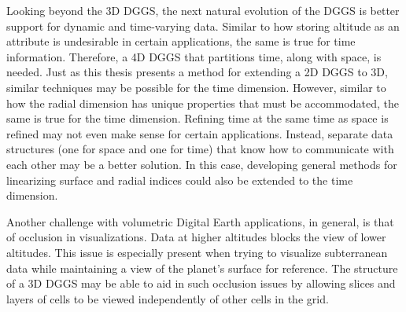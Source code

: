 Looking beyond the 3D DGGS, the next natural evolution of the DGGS is better support for dynamic and time-varying data.
Similar to how storing altitude as an attribute is undesirable in certain applications, the same is true for time information.
Therefore, a 4D DGGS that partitions time, along with space, is needed.
Just as this thesis presents a method for extending a 2D DGGS to 3D, similar techniques may be possible for the time dimension.
However, similar to how the radial dimension has unique properties that must be accommodated, the same is true for the time dimension.
Refining time at the same time as space is refined may not even make sense for certain applications.
Instead, separate data structures (one for space and one for time) that know how to communicate with each other may be a better solution.
In this case, developing general methods for linearizing surface and radial indices could also be extended to the time dimension.


Another challenge with volumetric Digital Earth applications, in general, is that of occlusion in visualizations.
Data at higher altitudes blocks the view of lower altitudes.
This issue is especially present when trying to visualize subterranean data while maintaining a view of the planet's surface for reference.
The structure of a 3D DGGS may be able to aid in such occlusion issues by allowing slices and layers of cells to be viewed independently of other cells in the grid.
